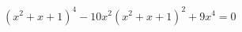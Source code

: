 \begin{ex}[type=equation]
	\begin{condition}
		$\left(x^2 + x + 1\right)^4 - 10x^2\left(x^2 + x + 1\right)^2 + 9x^4 = 0$
	\end{condition}
\end{ex}